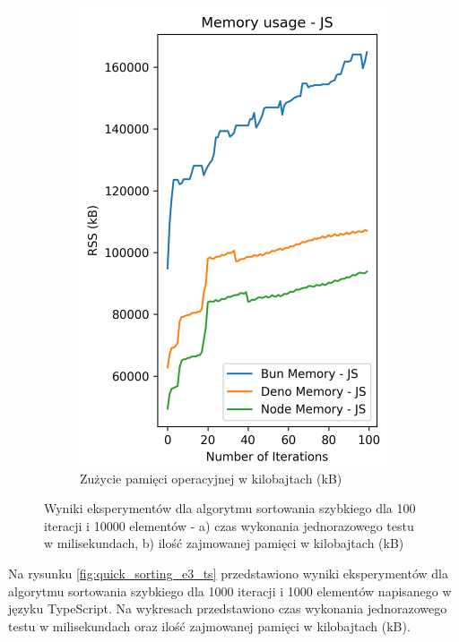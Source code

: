 \begin{figure}[H]
\begin{subfigure}[b]{0.42\textwidth}
    \includegraphics[width=\textwidth]{Figures/sorting/sorting_quick_100_10000_js_memory.png}
    \caption{Zużycie pamięci operacyjnej w kilobajtach (kB)}
    \label{fig:quick_sorting_e3_memory}
  \end{subfigure}
  \caption{Wyniki eksperymentów dla algorytmu sortowania szybkiego dla 100 iteracji i 10000 elementów - a) czas wykonania jednorazowego testu w milisekundach, b) ilość zajmowanej pamięci w kilobajtach (kB)}
  \label{fig:quick_sorting_e3}
\end{figure}

Na rysunku \ref{fig:quick_sorting_e3_ts} przedstawiono wyniki eksperymentów dla algorytmu sortowania szybkiego dla 1000 iteracji i 1000 elementów napisanego w języku TypeScript. Na wykresach przedstawiono czas wykonania jednorazowego testu w milisekundach oraz ilość zajmowanej pamięci w kilobajtach (kB).

